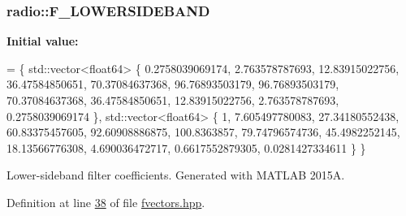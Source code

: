 \hypertarget{namespaceradio_a0ffd57d5a11ff70a1f55dbdc8ebe098d}{
\subsubsection[{F\+\_\+\+L\+O\+W\+E\+R\+S\+I\+D\+E\+B\+A\+N\+D}]{ radio\+::\+F\+\_\+\+L\+O\+W\+E\+R\+S\+I\+D\+E\+B\+A\+N\+D}}\label{namespaceradio_a0ffd57d5a11ff70a1f55dbdc8ebe098d}
{\bfseries Initial value\+:}
\begin{DoxyCode}
= \{ std::vector<float64> \{
        0.2758039069174,   
            2.763578787693,   
            12.83915022756,   
            36.47584850651,
            70.37084637368,   
            96.76893503179,   
            96.76893503179,   
            70.37084637368,
            36.47584850651,   
            12.83915022756,   
            2.763578787693,  
            0.2758039069174   
    \}, std::vector<float64> \{
        1,
            7.605497780083,   
            27.34180552438,   
            60.83375457605,
            92.60908886875,       
            100.8363857,    
            79.74796574736,     
            45.4982252145,
            18.13566776308,    
            4.690036472717,   
            0.6617552879305,   
            0.0281427334611
    \} \}
\end{DoxyCode}
Lower-\/sideband filter coefficients. Generated with M\+A\+T\+L\+A\+B 2015\+A. 

Definition at line \hyperlink{fvectors_8hpp_source_l00038}{38} of file \hyperlink{fvectors_8hpp_source}{fvectors.\+hpp}.

